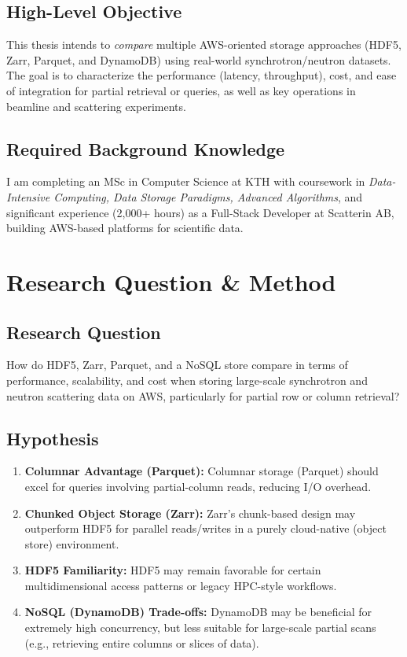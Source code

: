 \documentclass{article}
\begin{document}
\subsection{High-Level Objective}
This thesis intends to \emph{compare} multiple AWS-oriented storage approaches (HDF5, Zarr, Parquet, and DynamoDB) using real-world synchrotron/neutron datasets. The goal is to characterize the performance (latency, throughput), cost, and ease of integration for partial retrieval or queries, as well as key operations in beamline and scattering experiments.

\subsection{Required Background Knowledge}
I am completing an MSc in Computer Science at KTH with coursework in \emph{Data-Intensive Computing, Data Storage Paradigms, Advanced Algorithms}, and significant experience (2,000+ hours) as a Full-Stack Developer at Scatterin AB, building AWS-based platforms for scientific data.






\section{Research Question \& Method}

\subsection{Research Question}
How do HDF5, Zarr, Parquet, and a NoSQL store compare in terms of performance, scalability, and cost when storing large-scale synchrotron and neutron scattering data on AWS, particularly for partial row or column retrieval?


\subsection{Hypothesis}
\begin{enumerate}
    \item \textbf{Columnar Advantage (Parquet):} Columnar storage (Parquet) should excel for queries involving partial-column reads, reducing I/O overhead.
    \item \textbf{Chunked Object Storage (Zarr):} Zarr’s chunk-based design may outperform HDF5 for parallel reads/writes in a purely cloud-native (object store) environment.
    \item \textbf{HDF5 Familiarity:} HDF5 may remain favorable for certain multidimensional access patterns or legacy HPC-style workflows.
    \item \textbf{NoSQL (DynamoDB) Trade-offs:} DynamoDB may be beneficial for extremely high concurrency, but less suitable for large-scale partial scans (e.g., retrieving entire columns or slices of data).
\end{enumerate}
\end{document}
